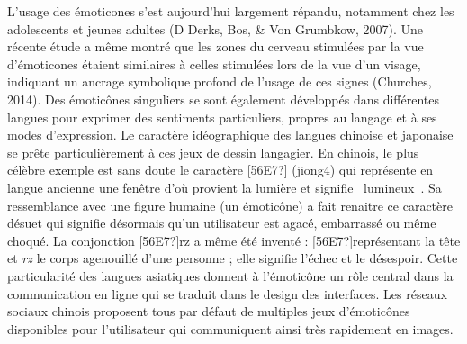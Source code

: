L{\textquoteright}usage des \'emoticones s{\textquoteright}est aujourd{\textquoteright}hui largement r\'epandu, notamment chez les adolescents et jeunes adultes (D Derks, Bos, \& Von Grumbkow, 2007). Une r\'ecente \'etude a m\^eme montr\'e que les zones du cerveau stimul\'ees par la vue d{\textquoteright}\'emoticones \'etaient similaires \`a celles stimul\'ees lors de la vue d{\textquoteright}un visage, indiquant un ancrage symbolique profond de l{\textquoteright}usage de ces signes (Churches, 2014). Des \'emotic\^ones singuliers se sont \'egalement d\'evelopp\'es dans diff\'erentes langues pour exprimer des sentiments particuliers, propres au langage et \`a ses modes d{\textquoteright}expression. Le caract\`ere id\'eographique des langues chinoise et japonaise se pr\^ete particuli\`erement \`a ces jeux de dessin langagier. En chinois, le plus c\'el\`ebre exemple est sans doute le caract\`ere [56E7?] (jiong4) qui repr\'esente en langue ancienne une fen\^etre d{\textquoteright}o\`u provient la lumi\`ere et signifie {\guillemotleft}~lumineux~{\guillemotright}. Sa ressemblance avec une figure humaine (un \'emotic\^one) a fait renaitre ce caract\`ere d\'esuet qui signifie d\'esormais qu{\textquoteright}un utilisateur est agac\'e, embarrass\'e ou m\^eme choqu\'e. La conjonction {\textquotedbl}[56E7?]rz{\textquotedbl} a m\^eme \'et\'e invent\'e : [56E7?]repr\'esentant la t\^ete et \textit{rz} le corps agenouill\'e d{\textquoteright}une personne ; elle signifie l{\textquoteright}\'echec et le d\'esespoir. Cette particularit\'e des langues asiatiques donnent \`a l{\textquoteright}\'emotic\^one un r\^ole central dans la communication en ligne qui se traduit dans le design des interfaces. Les r\'eseaux sociaux chinois proposent tous par d\'efaut de multiples jeux d{\textquoteright}\'emotic\^ones disponibles pour l{\textquoteright}utilisateur qui communiquent ainsi tr\`es rapidement en images.  
